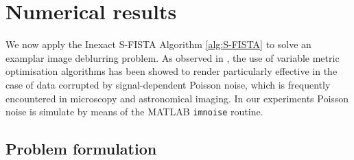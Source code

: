 \documentclass[conference]{IEEEtran}
\begin{document}
\section{Numerical results} \label{sec:results}

We now apply the Inexact S-FISTA Algorithm \ref{alg:S-FISTA} to solve an examplar image deblurring problem. As observed in \cite{Bertero2018} , the use of variable metric optimisation algorithms has been showed to render particularly effective in the case of data corrupted by signal-dependent Poisson noise, which is frequently encountered in microscopy and astronomical imaging.  In our experiments Poisson noise is simulate by means of the MATLAB \texttt{imnoise} routine.  



\subsection{Problem formulation}
\end{document}
